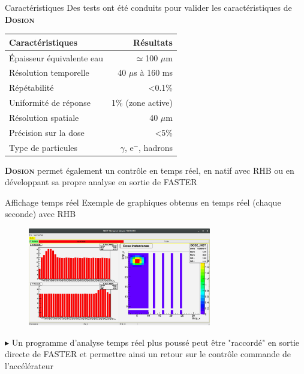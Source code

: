 \documentclass[10pt]{beamer}
\newcommand{\dosion}{\textbf{\textsc{Dosion}}\xspace}
\begin{document}
{
\begin{frame}[fragile]{Caractéristiques}
Des tests ont été conduits pour valider les caractéristiques de \dosion\cite{boissonnat:2015}
\begin{center}
\begin{tabular}{lr}
\hline
Caractéristiques&\hspace{3cm}Résultats\\
\hline
\hline
\'Epaisseur équivalente eau&\alert{$\simeq$100 $\mu$m}\\
Résolution temporelle&\alert{40 $\mu$s à 160 ms}\\
Répétabilité&\alert{<0.1\%}\\
Uniformité de réponse&\alert{1\% (zone active)}\\
Résolution spatiale&\alert{40 $\mu$m}\\
Précision sur la dose&\alert{<5\%}\\
Type de particules&\alert{$\gamma$, e$^-$, hadrons}\\
\hline
\end{tabular} 
\end{center}

\dosion permet également un contrôle en \alert{temps réel}, en natif avec RHB ou en développant sa propre analyse en sortie de FASTER
\end{frame}
}

\begin{frame}[fragile]{Affichage temps réel}
Exemple de graphiques obtenus en temps réel (chaque seconde) avec \alert{RHB}
\begin{figure}[h]
\begin{center}
\includegraphics[width=8cm]{RHB.png} 
\end{center}
\end{figure}
$\blacktriangleright$ Un programme d'analyse temps réel plus poussé peut être "raccordé" en sortie directe de FASTER et permettre ainsi un retour sur le contrôle commande de l'accélérateur
\end{frame}
\end{document}
